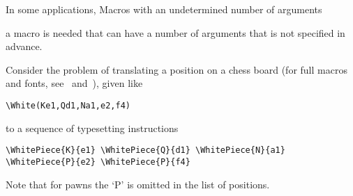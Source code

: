 \documentclass[letterpaper]{book}
\begin{document}
In some applications,
\howto  Macros with an undetermined number
of arguments\par
a macro is needed that can have a
number of arguments that is not specified in advance.

Consider the problem of translating a position on a chess board
(for full macros and fonts, see~\cite{chess} and~\cite{Tut}),
given like
\begin{verbatim}
\White(Ke1,Qd1,Na1,e2,f4)
\end{verbatim} 
to a sequence of typesetting instructions
\begin{verbatim}
\WhitePiece{K}{e1} \WhitePiece{Q}{d1} \WhitePiece{N}{a1} 
\WhitePiece{P}{e2} \WhitePiece{P}{f4}
\end{verbatim}
Note that for pawns the `P' is omitted in the list of positions.
\end{document}
